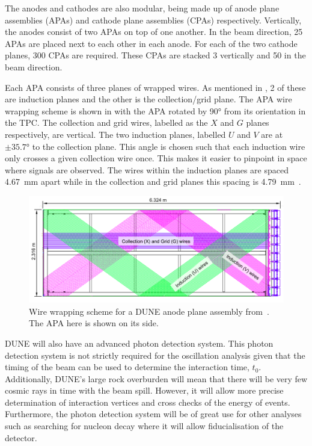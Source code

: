 The anodes and cathodes are also modular, being made up of anode plane assemblies (APAs) and cathode plane assemblies (CPAs) respectively.
Vertically, the anodes consist of two APAs on top of one another.
In the beam direction, 25 APAs are placed next to each other in each anode.
For each of the two cathode planes, 300 CPAs are required.
These CPAs are stacked 3 vertically and 50 in the beam direction.

Each APA consists of three planes of wrapped wires.
As mentioned in , 2 of these are induction planes and the other is the collection/grid plane.
The APA wire wrapping scheme is shown in  with the APA rotated by \ang{90} from its orientation in the TPC.
The collection and grid wires, labelled as the $X$ and $G$ planes respectively, are vertical.
The two induction planes, labelled $U$ and $V$ are at $\pm\ang{35.7}$ to the collection plane.
This angle is chosen such that each induction wire only crosses a given collection wire once.
This makes it easier to pinpoint in space where signals are observed.
The wires within the induction planes are spaced \SI{4.67}{\milli\metre} apart while in the collection and grid planes this spacing is \SI{4.79}{\milli\metre}~\cite{tdrVol4}.

\begin{figure}[h]
  \centering
  \includegraphics[width=.95\linewidth]{files/figures/dune_detector/wireWrapping}
  \caption[Wire wrapping scheme for a DUNE anode plane assembly]{Wire wrapping scheme for a DUNE anode plane assembly from~\cite{tdrVol4}. The APA here is shown on its side.}
  \label{fig:wireWrapping}
\end{figure}

DUNE will also have an advanced photon detection system.
This photon detection system is not strictly required for the oscillation analysis given that the timing of the beam can be used to determine the interaction time, $t_{0}$.
Additionally, DUNE's large rock overburden will mean that there will be very few cosmic rays in time with the beam spill.
However, it will allow more precise determination of interaction vertices and cross checks of the energy of events.
Furthermore, the photon detection system will be of great use for other analyses such as searching for nucleon decay where it will allow fiducialisation of the detector.

